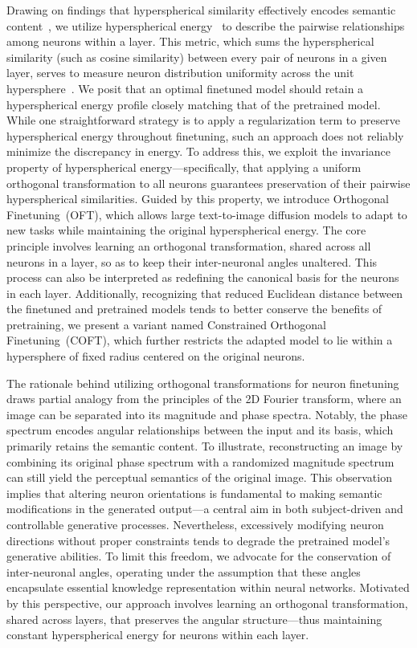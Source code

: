 Drawing on findings that hyperspherical similarity effectively encodes semantic content~\cite{liu2017deep,liu2018decoupled,chen2020angular}, we utilize hyperspherical energy~\cite{liu2018learning} to describe the pairwise relationships among neurons within a layer. This metric, which sums the hyperspherical similarity (such as cosine similarity) between every pair of neurons in a given layer, serves to measure neuron distribution uniformity across the unit hypersphere~\cite{liu2021learning}. We posit that an optimal finetuned model should retain a hyperspherical energy profile closely matching that of the pretrained model. While one straightforward strategy is to apply a regularization term to preserve hyperspherical energy throughout finetuning, such an approach does not reliably minimize the discrepancy in energy. To address this, we exploit the invariance property of hyperspherical energy—specifically, that applying a uniform orthogonal transformation to all neurons guarantees preservation of their pairwise hyperspherical similarities. Guided by this property, we introduce Orthogonal Finetuning~(OFT), which allows large text-to-image diffusion models to adapt to new tasks while maintaining the original hyperspherical energy. The core principle involves learning an orthogonal transformation, shared across all neurons in a layer, so as to keep their inter-neuronal angles unaltered. This process can also be interpreted as redefining the canonical basis for the neurons in each layer. Additionally, recognizing that reduced Euclidean distance between the finetuned and pretrained models tends to better conserve the benefits of pretraining, we present a variant named Constrained Orthogonal Finetuning~(COFT), which further restricts the adapted model to lie within a hypersphere of fixed radius centered on the original neurons.

The rationale behind utilizing orthogonal transformations for neuron finetuning draws partial analogy from the principles of the 2D Fourier transform, where an image can be separated into its magnitude and phase spectra. Notably, the phase spectrum encodes angular relationships between the input and its basis, which primarily retains the semantic content. To illustrate, reconstructing an image by combining its original phase spectrum with a randomized magnitude spectrum can still yield the perceptual semantics of the original image. This observation implies that altering neuron orientations is fundamental to making semantic modifications in the generated output—a central aim in both subject-driven and controllable generative processes. Nevertheless, excessively modifying neuron directions without proper constraints tends to degrade the pretrained model’s generative abilities. To limit this freedom, we advocate for the conservation of inter-neuronal angles, operating under the assumption that these angles encapsulate essential knowledge representation within neural networks. Motivated by this perspective, our approach involves learning an orthogonal transformation, shared across layers, that preserves the angular structure—thus maintaining constant hyperspherical energy for neurons within each layer.

